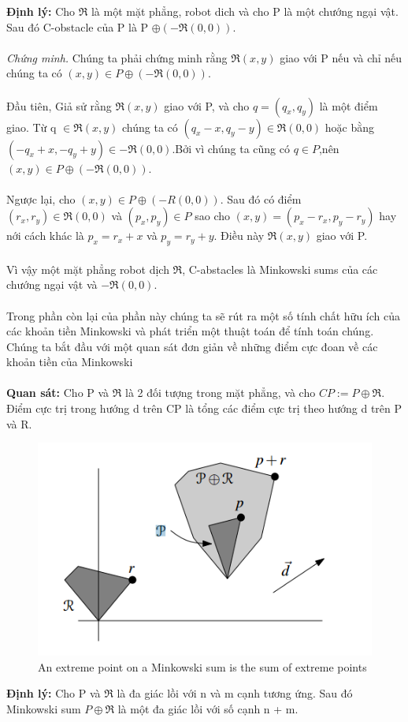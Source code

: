 \documentclass[a4paper,12pt]{report}
\begin{document}
\textbf{Định lý: } Cho $\Re$ là một mặt phẳng, robot dich và cho  P là một chướng ngại vật. Sau đó C-obstacle của P là P $\oplus (-\Re(0,0))$. \\ \\
\textit{Chứng minh.} Chúng ta phải chứng minh rằng $\Re(x,y)$ giao với P nếu và chỉ nếu chúng ta có $(x,y) \in P \oplus (-\Re(0,0)).$\\ \\
Đầu tiên, Giả sử rằng $\Re(x,y)$ giao với P, và cho $q = (q_x,q_y)$ là một điểm giao. Từ q $\in \Re(x,y)$ chúng ta có $(q_x -x , q_y - y) \in \Re(0,0)$ hoặc bằng $(-q_x + x, -q_y + y)\in -\Re(0,0)$.Bởi vì chúng ta cũng có $q \in P$,nên $(x,y) \in P \oplus (-\Re(0,0))$.\\ \\
Ngược lại, cho $(x,y) \in P \oplus (-R(0,0))$. Sau đó có điểm $(r_x,r_y) \in \Re(0,0)$ và $(p_x,p_y)\in P$ sao cho $(x,y) = (p_x - r_x, p_y - r_y)$ hay nới cách khác là $p_x = r_x + x$ và $p_y = r_y + y$. Điều này $\Re(x,y)$ giao với P.\\ \\
Vì vậy một mặt phẳng robot dịch $\Re$, C-abstacles là Minkowski sums của các chướng ngại vật và $-\Re(0,0)$. \\ \\
Trong phần còn lại của phần này chúng ta sẽ rút ra một số tính chất hữu ích của các khoản tiền Minkowski và phát triển một thuật toán để tính toán chúng. Chúng ta bắt đầu với một quan sát đơn giản về những điểm cực đoan về các khoản tiền của Minkowski \\ \\
\textbf{Quan sát: }Cho P và $\Re$ là 2 đối tượng trong mặt phẳng, và cho $CP := P \oplus \Re$. Điểm cực trị trong hướng d trên CP là tổng các điểm cực trị theo hướng d trên P và R.\\
\begin{figure}[H]
\centering
\includegraphics[width=0.5\linewidth]{5.png}
\caption{An extreme point on a Minkowski sum is the sum of extreme points}
\end{figure}
\textbf{Định lý: } Cho P và $\Re$ là đa giác lồi với n và m cạnh tương ứng. Sau đó Minkowski sum $P \oplus \Re$ là một đa giác lồi với số cạnh n + m. \\ \\
\end{document}
